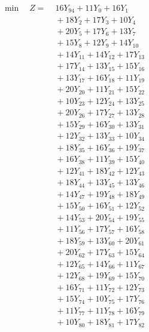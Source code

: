 \documentclass[a4paper,10pt]{article}
\begin{document}
\allowdisplaybreaks
{\small
\begin{align}
\min \quad Z = &\; 16 Y_{94} + 11 Y_{0} + 16 Y_{1} \\[0.3ex]
&\;  + 18 Y_{2} + 17 Y_{3} + 10 Y_{4} \\[0.3ex]
&\;  + 20 Y_{5} + 17 Y_{6} + 13 Y_{7} \\[0.3ex]
&\;  + 15 Y_{8} + 12 Y_{9} + 14 Y_{10} \\[0.3ex]
&\;  + 14 Y_{11} + 14 Y_{12} + 17 Y_{13} \\[0.3ex]
&\;  + 17 Y_{14} + 13 Y_{15} + 15 Y_{16} \\[0.3ex]
&\;  + 13 Y_{17} + 16 Y_{18} + 11 Y_{19} \\[0.3ex]
&\;  + 20 Y_{20} + 11 Y_{21} + 15 Y_{22} \\[0.3ex]
&\;  + 10 Y_{23} + 12 Y_{24} + 13 Y_{25} \\[0.3ex]
&\;  + 20 Y_{26} + 17 Y_{27} + 13 Y_{28} \\[0.5ex]\allowbreak
&\;  + 15 Y_{29} + 16 Y_{30} + 13 Y_{31} \\[0.3ex]
&\;  + 12 Y_{32} + 13 Y_{33} + 10 Y_{34} \\[0.3ex]
&\;  + 18 Y_{35} + 16 Y_{36} + 19 Y_{37} \\[0.3ex]
&\;  + 16 Y_{38} + 11 Y_{39} + 15 Y_{40} \\[0.3ex]
&\;  + 12 Y_{41} + 18 Y_{42} + 12 Y_{43} \\[0.3ex]
&\;  + 18 Y_{44} + 13 Y_{45} + 13 Y_{46} \\[0.3ex]
&\;  + 14 Y_{47} + 19 Y_{48} + 18 Y_{49} \\[0.3ex]
&\;  + 15 Y_{50} + 16 Y_{51} + 12 Y_{52} \\[0.3ex]
&\;  + 14 Y_{53} + 20 Y_{54} + 19 Y_{55} \\[0.3ex]
&\;  + 11 Y_{56} + 17 Y_{57} + 16 Y_{58} \\[0.5ex]\allowbreak
&\;  + 18 Y_{59} + 13 Y_{60} + 20 Y_{61} \\[0.3ex]
&\;  + 20 Y_{62} + 17 Y_{63} + 15 Y_{64} \\[0.3ex]
&\;  + 12 Y_{65} + 14 Y_{66} + 11 Y_{67} \\[0.3ex]
&\;  + 12 Y_{68} + 19 Y_{69} + 15 Y_{70} \\[0.3ex]
&\;  + 16 Y_{71} + 11 Y_{72} + 12 Y_{73} \\[0.3ex]
&\;  + 15 Y_{74} + 10 Y_{75} + 17 Y_{76} \\[0.3ex]
&\;  + 11 Y_{77} + 11 Y_{78} + 16 Y_{79} \\[0.3ex]
&\;  + 10 Y_{80} + 18 Y_{81} + 17 Y_{82} \\[0.3ex]

\end{align}}
\end{document}
